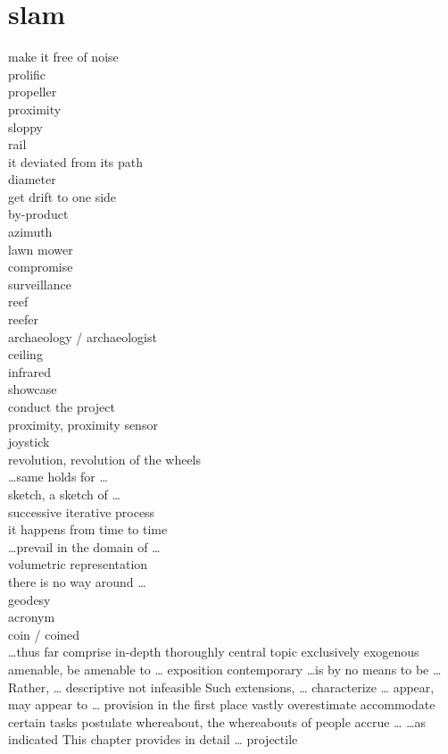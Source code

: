 \documentclass[12pt]{article}
\begin{document}
\section{slam}
make it free of noise \\
prolific \\
propeller \\
proximity \\
sloppy \\
rail \\
it deviated from its path \\
diameter \\
get drift to one side \\
by-product \\
azimuth \\
lawn mower \\
compromise \\
surveillance \\
reef \\
reefer \\
archaeology / archaeologist \\
ceiling \\
infrared \\
showcase \\
conduct the project \\
proximity, proximity sensor \\
joystick \\
revolution, revolution of the wheels \\
\dots same holds for \dots \\
sketch, a sketch of \dots \\
successive iterative process \\
it happens from time to time \\
\dots prevail in the domain of \dots \\
volumetric representation \\
there is no way around \dots \\
geodesy \\
acronym \\
coin / coined \\
\dots thus far 
comprise 
in-depth 
thoroughly 
central topic 
exclusively 
exogenous 
amenable, be amenable to \dots 
exposition 
contemporary 
\dots is by no means to be \dots 
Rather, \dots 
descriptive 
not infeasible 
Such extensions, \dots 
characterize \dots 
appear, may appear to \dots 
provision 
in the first place 
vastly 
overestimate 
accommodate certain tasks 
postulate 
whereabout, the whereabouts of people 
accrue \dots 
\dots as indicated 
This chapter provides in detail \dots 
projectile 
\end{document}
